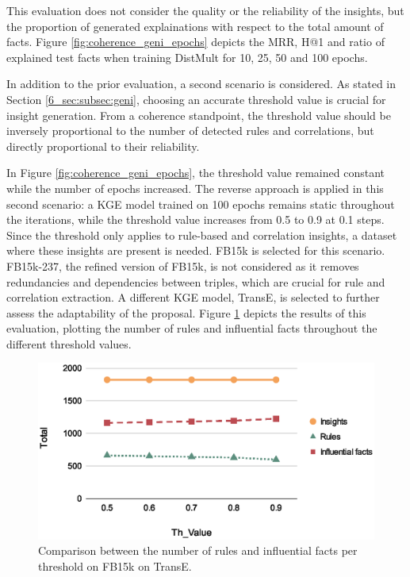 This evaluation does not consider the quality or the reliability of the insights, but the proportion of generated explainations with respect to the total amount of facts. Figure \ref{fig:coherence_geni_epochs} depicts the MRR, H@1 and ratio of explained test facts when training DistMult for 10, 25, 50 and 100 epochs.

In addition to the prior evaluation, a second scenario is considered. As stated in Section \ref{6_sec:subsec:geni}, choosing an accurate threshold value is crucial for insight generation. From a coherence standpoint, the threshold value should be inversely proportional to the number of detected rules and correlations, but directly proportional to their reliability. 

In Figure \ref{fig:coherence_geni_epochs}, the threshold value remained constant while the number of epochs increased. The reverse approach is applied in this second scenario: a KGE model trained on 100 epochs remains static throughout the iterations, while the threshold value increases from 0.5 to 0.9 at 0.1 steps. Since the threshold only applies to rule-based and correlation insights, a dataset where these insights are present is needed. FB15k is selected for this scenario. FB15k-237, the refined version of FB15k, is not considered as it removes redundancies and dependencies between triples, which are crucial for rule and correlation extraction. A different KGE model, TransE, is selected to further assess the adaptability of the proposal. Figure \ref{fig:coherence_geni_th} depicts the results of this evaluation, plotting the number of rules and influential facts throughout the different threshold values.

\begin{figure}[t]
    \centering
    \includegraphics[width=.9\linewidth]{6_kbsextractiondl/figures/coherence_geni_th.eps}
    \caption{Comparison between the number of rules and influential facts per threshold on FB15k on TransE.}
    \label{fig:coherence_geni_th}
\end{figure}

